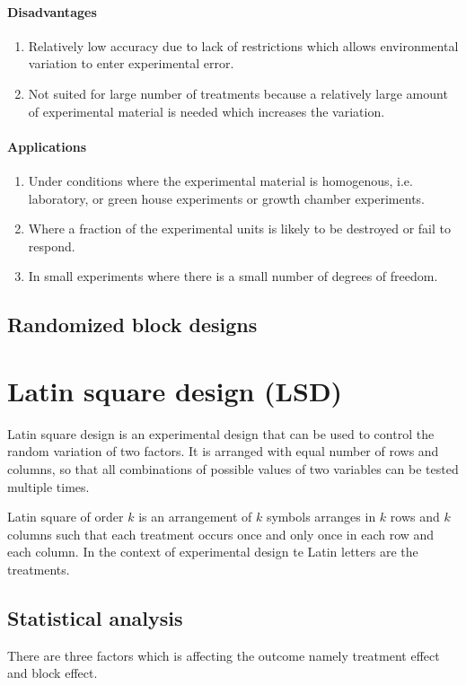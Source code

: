\documentclass[oneside,11pt,pdftex]{book}%
\numberwithin{equation}{section}
\numberwithin{section}{chapter}
\numberwithin{equation}{chapter}
\begin{document}
\subsubsection{Disadvantages}
\begin{enumerate}
	\item Relatively low accuracy due to lack of restrictions which allows environmental variation to enter experimental error.
	\item Not suited for large number of treatments because a relatively large amount of experimental material is needed which increases the variation.
\end{enumerate}
\subsubsection{Applications}
\begin{enumerate}
	\item Under conditions where the experimental material is homogenous, i.e. laboratory, or green house experiments or growth chamber experiments.
	\item Where a fraction of the experimental units is likely to be destroyed or fail to respond.
	\item In small experiments where there is a small number of degrees of freedom.
\end{enumerate}

\section{Randomized block designs}






\chapter{Latin square design (LSD)}
Latin square design is an experimental design that can be used to control the random variation of two factors. It is arranged with equal number of rows and columns, so that all combinations of possible values of two variables can be tested multiple times.

Latin square of order $ k $ is an arrangement of $ k $ symbols arranges in $ k $ rows and $ k $ columns such that each treatment occurs once and only once in each row and each column. In the context of experimental design te Latin letters are the treatments.

\section{Statistical analysis}
There are three factors which is affecting the outcome namely treatment effect and block effect.
\end{document}
